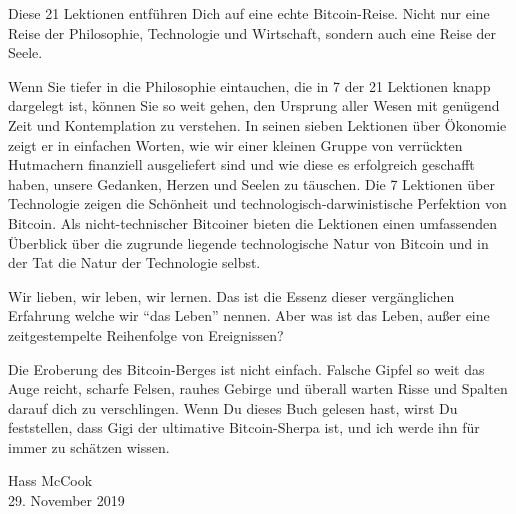 Diese 21 Lektionen entführen Dich auf eine echte Bitcoin-Reise. Nicht nur eine
Reise der Philosophie, Technologie und Wirtschaft, sondern auch eine Reise der
Seele.

Wenn Sie tiefer in die Philosophie eintauchen, die in 7 der 21 Lektionen knapp
dargelegt ist, können Sie so weit gehen, den Ursprung aller Wesen mit genügend
Zeit und Kontemplation zu verstehen. In seinen sieben Lektionen über Ökonomie
zeigt er in einfachen Worten, wie wir einer kleinen Gruppe von verrückten
Hutmachern finanziell ausgeliefert sind und wie diese es erfolgreich geschafft
haben, unsere Gedanken, Herzen und Seelen zu täuschen. Die 7 Lektionen über
Technologie zeigen die Schönheit und technologisch-darwinistische Perfektion von
Bitcoin. Als nicht-technischer Bitcoiner bieten die Lektionen einen umfassenden
Überblick über die zugrunde liegende technologische Natur von Bitcoin und in der
Tat die Natur der Technologie selbst.

Wir lieben, wir leben, wir lernen. Das ist die Essenz dieser vergänglichen
Erfahrung welche wir \enquote{das Leben} nennen. Aber was ist das Leben, außer
eine zeitgestempelte Reihenfolge von Ereignissen?

Die Eroberung des Bitcoin-Berges ist nicht einfach. Falsche Gipfel so weit das
Auge reicht, scharfe Felsen, rauhes Gebirge und überall warten Risse und Spalten
darauf dich zu verschlingen. Wenn Du dieses Buch gelesen hast, wirst Du
feststellen, dass Gigi der ultimative Bitcoin-Sherpa ist, und ich werde ihn für
immer zu schätzen wissen.

\begin{flushright}
  Hass McCook \\
  29. November 2019
\end{flushright}
